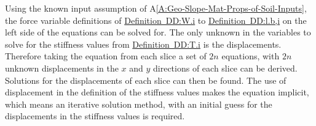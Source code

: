 \documentclass[12pt]{article}
\begin{document}
Using the known input assumption of A\ref{A:Geo-Slope-Mat-Props-of-Soil-Inputs}, the force variable definitions of \hyperref[DD:W.i]{Definition~DD:W.i} to \hyperref[DD:l.b,i]{Definition~DD:l.b,i} on the left side of the equations can be solved for. The only unknown in the variables to solve for the stiffness values from \hyperref[DD:T.i]{Definition~DD:T.i} is the displacements. Therefore taking the equation from each slice a set of $2 n$ equations, with $2 n$ unknown displacements in the $x$ and $y$ directions of each slice can be derived. Solutions for the displacements of each slice can then be found. The use of displacement in the definition of the stiffness values makes the equation implicit, which means an iterative solution method, with an initial guess for the displacements in the stiffness values is required.
~\newline
\end{document}
